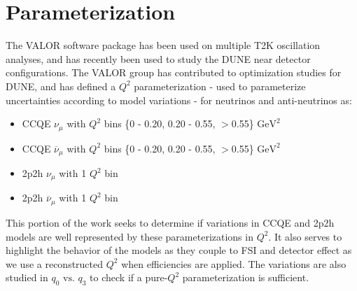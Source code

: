 \documentclass[12pt]{article}
\begin{document}
\section{Parameterization}
The VALOR software package has been used on multiple T2K oscillation analyses, and has recently been used to study the DUNE near detector configurations. %
The VALOR group has contributed to optimization studies for DUNE\cite{VALOR}, and has defined a $Q^2$ parameterization  - used to parameterize uncertainties according to model variations - for neutrinos and anti-neutrinos as: 
\begin{itemize}
\item CCQE $\nu_{\mu}$ with $Q^2$ bins \{0 - 0.20, 0.20 - 0.55, $>$0.55\} $\textrm{GeV}^2$
\item CCQE $\overline{\nu}_{\mu}$ with $Q^2$ bins \{0 - 0.20, 0.20 - 0.55, $>$0.55\} $\textrm{GeV}^2$
\item 2p2h $\nu_{\mu}$ with 1 $Q^2$ bin 
\item 2p2h $\overline{\nu}_{\mu}$ with 1 $Q^2$ bin
\end{itemize}

This portion of the work seeks to determine if variations in CCQE and 2p2h models are well represented by these parameterizations in $Q^2$. It also serves to highlight the behavior of the models as they couple to FSI and detector effect as we use a reconstructed $Q^2$ when efficiencies are applied. The variations are also studied in $q_0 \textrm{ vs. } q_3$ to check if a pure-$Q^2$ parameterization is sufficient.
\end{document}
